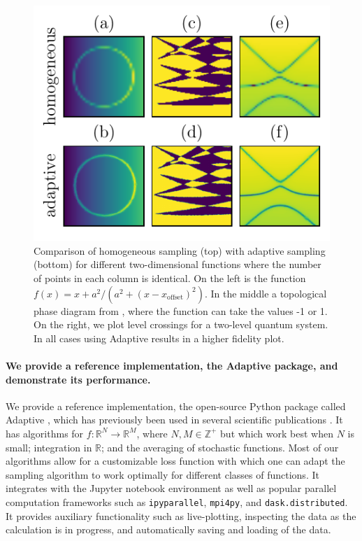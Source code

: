 \documentclass[english, twocolumn, 10pt, aps, superscriptaddress, floatfix, prb, citeautoscript]{revtex4-1}
\renewcommand{\citep}{\cite}
\newcommand{\passthrough}[1]{\lstset{mathescape=false}#1\lstset{mathescape=true}}
\begin{document}
\begin{figure}
\hypertarget{fig:Learner2D}{%
\centering
\includegraphics{figures/Learner2D.pdf}
\caption{Comparison of homogeneous sampling (top) with adaptive sampling (bottom) for different two-dimensional functions where the number of points in each column is identical.
On the left is the function \(f(x) = x + a ^ 2 / (a ^ 2 + (x - x_\textrm{offset}) ^ 2)\).
In the middle a topological phase diagram from , where the function can take the values -1 or 1.
On the right, we plot level crossings for a two-level quantum system.
In all cases using Adaptive results in a higher fidelity plot.}\label{fig:Learner2D}
}
\end{figure}

\hypertarget{we-provide-a-reference-implementation-the-adaptive-package-and-demonstrate-its-performance.}{%
\paragraph{We provide a reference implementation, the Adaptive package, and demonstrate its performance.}\label{we-provide-a-reference-implementation-the-adaptive-package-and-demonstrate-its-performance.}}

We provide a reference implementation, the open-source Python package called Adaptive \citep{Nijholt2019}, which has previously been used in several scientific publications \citep{Vuik2018, Laeven2019, Bommer2019, Melo2019}.
It has algorithms for \(f \colon \mathbb{R}^N \to \mathbb{R}^M\), where \(N, M \in \mathbb{Z}^+\) but which work best when \(N\) is small; integration in \(\mathbb{R}\); and the averaging of stochastic functions.
Most of our algorithms allow for a customizable loss function with which one can adapt the sampling algorithm to work optimally for different classes of functions.
It integrates with the Jupyter notebook environment as well as popular parallel computation frameworks such as \passthrough{\lstinline!ipyparallel!}, \passthrough{\lstinline!mpi4py!}, and \passthrough{\lstinline!dask.distributed!}.
It provides auxiliary functionality such as live-plotting, inspecting the data as the calculation is in progress, and automatically saving and loading of the data.
\end{document}
